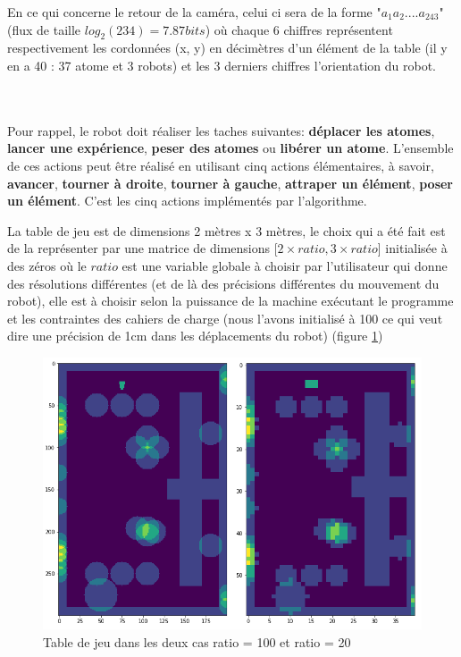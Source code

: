 \documentclass{article}
\begin{document}
En ce qui concerne le retour de la caméra, celui ci sera de la forme "$a_{1}a_{2}....a_{243}$" (flux de taille $log_{2}(234) = 7.87 bits$) où chaque 6 chiffres représentent respectivement les cordonnées (x, y) en décimètres d'un élément de la table (il y en a 40 : 37 atome et 3 robots) et les 3 derniers chiffres l'orientation du robot.

\\ \\
Pour rappel, le robot doit réaliser les taches suivantes: \textbf{déplacer les atomes}, \textbf{lancer une expérience}, \textbf{peser des atomes} ou \textbf{libérer un atome}. L'ensemble de ces actions peut être réalisé en utilisant cinq actions élémentaires, à savoir, \textbf{avancer}, \textbf{tourner à droite}, \textbf{tourner à gauche}, \textbf{attraper un élément}, \textbf{poser un élément}. C'est les cinq actions implémentés par l'algorithme.

La table de jeu est de dimensions 2 mètres x 3 mètres, le choix qui a été fait est de la représenter par une matrice de dimensions [$2 \times ratio, 3 \times ratio$] initialisée à des zéros où le $ratio$ est une variable globale à choisir par l'utilisateur qui donne des résolutions différentes (et de là des précisions différentes du mouvement du robot), elle est à choisir selon la puissance de la machine exécutant le programme et les contraintes des cahiers de charge (nous l'avons initialisé à 100 ce qui veut dire une précision de 1cm dans les déplacements du robot) (figure \ref{fig:ratiofig}) 

\begin{figure}[h!]
\centering
\includegraphics[scale=0.45]{ratiofig}
\caption{Table de jeu dans les deux cas ratio = 100 et ratio = 20}
\label{fig:ratiofig}
\end{figure}
\end{document}
